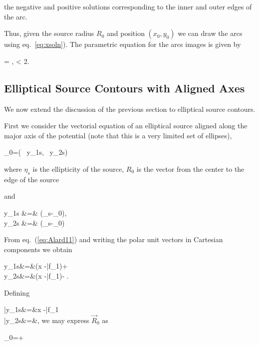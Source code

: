 the negative and positive solutions corresponding to the inner and outer edges
of the arc.

Thus, given the source radius $R_{0}$ and position $(x_0,y_0)$ we can
draw the arcs using eq.~\eqref{eq:xsoln}). The parametric equation for the
arcs images is given by

\beq
\label{eq:parametricarcs}
= ,  \leq \te <
2\pi.
\eeq


\subsection{Elliptical Source Contours with Aligned Axes}

We now extend the discussion of the previous section to elliptical
source contours.

First we consider the vectorial equation of an elliptical source
aligned along the major axis of the potential (note that this is a
very limited set of ellipses),

\beq
\label{eq:ellipse}
_0=\left( \, y_{1s}, \, y_{2s}\right)
\eeq

where $\eta_s$ is the ellipticity of the source, $R_0$ is the vector from the
center to the edge of the source

and
 
\bea
y_{1s} &=& (_s-_0)\cdot{}, \\
y_{2s} &=& (_s-_0)\cdot{}
\eea

From eq.~(\ref{eq:Alard11}) and writing the polar unit vectors in Cartesian
components we obtain

\bea
y_{1s}&=&(\kt x -\bar{f}_1)\cos{\te}+\sin{\te} \label{y_1s}\\
y_{2s}&=&(\kt x -\bar{f}_1)\sin{\te}-\cos{\te} \label{y_2s}.
\eea

Defining

\bea
\bar{y}_{1s}&=&\kt x -\bar{f}_1\label{bar_y1}\\
\bar{y}_{2s}&=&,\label{bar_y2}
\eea
we may express $\vec{R}_0$ as

\beq
{}_0=\hat{\imath}+\hat{\jmath}
\eeq

